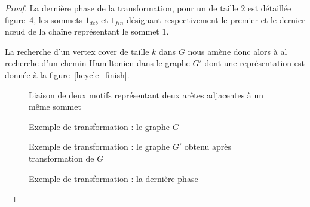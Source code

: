 \begin{proof}
    La dernière phase de la transformation, pour un \vcover de taille $2$ est détaillée
    figure~\ref{hcycle_last}, les sommets $1_{deb}$ et $1_{fin}$ désignant respectivement le premier
    et le dernier n\oe ud de la chaîne représentant le sommet $1$. 

    La recherche d'un vertex cover de taille $k$ dans $G$ nous amène donc alors à al recherche d'un
    chemin Hamiltonien dans le graphe $G'$ dont une représentation est donnée à la
    figure~\ref{hcycle_finish}.

    \begin{figure}
        \begin{center}
            \begin{tikzpicture}[scale=0.8, every node/.style={transform shape}]
                
            \end{tikzpicture}
            \caption{Liaison de deux motifs représentant deux arêtes adjacentes à un même sommet}
            \label{hcycle_couple}
        \end{center}
    \end{figure}

    \begin{figure}
        \begin{center}
            \begin{tikzpicture}
                
            \end{tikzpicture}
            \caption{Exemple de transformation : le graphe $G$}
            \label{hcycle_graphe_g}
        \end{center}
    \end{figure}

    \begin{figure}
        \begin{center}
            \begin{tikzpicture}[scale=0.6, every node/.style={transform shape}, tmp/.style={inner
                    sep=0mm, node distance=3mm}]
                
            \end{tikzpicture}
            \caption{Exemple de transformation : le graphe $G'$ obtenu après transformation de $G$}
            \label{hcycle_graphe_gprime}
        \end{center}
    \end{figure}

    \begin{figure}
        \begin{center}
            \begin{tikzpicture}[scale=2, tmp/.style={vertex, minimum size=10mm}]
                
            \end{tikzpicture}
            \caption{Exemple de transformation : la dernière phase}
            \label{hcycle_last}
        \end{center}
    \end{figure}


\end{proof}
